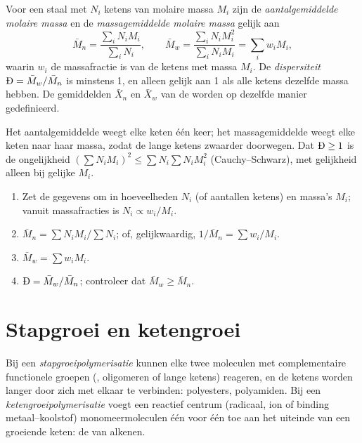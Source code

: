 \begin{definition}\label{def:b2:polymer-synthesis:averages}
Voor een staal met $N_i$ ketens van molaire massa $M_i$ zijn de \emph{aantalgemiddelde molaire
massa} en de \emph{massagemiddelde molaire massa}
gelijk aan
\begin{equation*}
\bar M_n = \frac{\sum_i N_i M_i}{\sum_i N_i}, \qquad
\bar M_w = \frac{\sum_i N_i M_i^2}{\sum_i N_i M_i} = \sum_i w_i M_i,
\end{equation*}
waarin $w_i$ de massafractie is van de ketens met massa $M_i$. De \emph{dispersiteit}
$\text{\DH} = \bar M_w/\bar M_n$ is minstens 1, en alleen gelijk aan 1 als alle ketens dezelfde
massa hebben. De gemiddelden $\bar X_n$ en $\bar X_w$ van de  worden op dezelfde manier
gedefinieerd.
\end{definition}

Het aantalgemiddelde weegt elke keten één keer; het massagemiddelde weegt elke keten naar haar massa, zodat de
lange ketens zwaarder doorwegen. Dat $\text{\DH} \ge 1$ is de ongelijkheid $\left(\sum N_i M_i\right)^2 \le
\sum N_i \sum N_i M_i^2$ (Cauchy--Schwarz), met gelijkheid alleen bij gelijke $M_i$.

\begin{method}\label{met:b2:polymer-synthesis:averages}
\begin{enumerate}
  \item Zet de gegevens om in hoeveelheden $N_i$ (of aantallen ketens) en massa's $M_i$; vanuit massafracties is
        $N_i \propto w_i/M_i$.
  \item $\bar M_n = \sum N_i M_i / \sum N_i$; of, gelijkwaardig, $1/\bar M_n = \sum w_i/M_i$.
  \item $\bar M_w = \sum w_i M_i$.
  \item $\text{\DH} = \bar M_w/\bar M_n$; controleer dat $\bar M_w \ge \bar M_n$.
\end{enumerate}
\end{method}

\section{Stapgroei en ketengroei}

\begin{definition}\label{def:b2:polymer-synthesis:step-chain}
Bij een \emph{stapgroeipolymerisatie} kunnen elke twee moleculen met
complementaire functionele groepen (, oligomeren of lange ketens) reageren, en de ketens
worden langer door zich met elkaar te verbinden: polyesters, polyamiden. Bij een
\emph{ketengroeipolymerisatie} voegt een reactief centrum (radicaal, ion of binding
metaal--koolstof) monomeermoleculen één voor één toe aan het uiteinde van een groeiende keten: de  van alkenen.
\end{definition}

